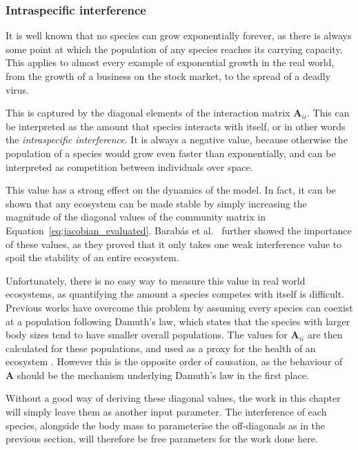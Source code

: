 \subsubsection{Intraspecific interference}
It is well known that no species can grow exponentially forever, as there is always some point at which the population of any species reaches its carrying capacity. 
This applies to almost every example of exponential growth in the real world, from the growth of a business on the stock market, to the spread of a deadly virus.

This is captured by the diagonal elements of the interaction matrix $\mathbf{A}_{ii}$. This can be interpreted as the amount that species interacts with itself, or in other words the \emph{intraspecific interference}. It is always a negative value, because otherwise the population of a species would grow even faster than exponentially, and can be interpreted as competition between individuals over space.

This value has a strong effect on the dynamics of the model. In fact, it can be shown that any ecosystem can be made stable by simply increasing the magnitude of the diagonal values of the community matrix in Equation~\eqref{eq:jacobian_evaluated}. 
Barab\'as et al.\ \cite{Barabas2017} further showed the importance of these values, as they proved that it only takes one weak interference value to spoil the stability of an entire ecosystem.

Unfortunately, there is no easy way to measure this value in real world ecosystems, as quantifying the amount a species competes with itself is difficult. Previous works have overcome this problem by assuming every species can coexist at a population following Damuth's law, which states that the species with larger body sizes tend to have smaller overall populations. The values for $\mathbf{A}_{ii}$ are then calculated for these populations, and used as a proxy for the health of an ecosystem \cite{Pawar}. However this is the opposite order of causation, as the behaviour of $\mathbf{A}$ should be the mechanism underlying Damuth's law in the first place.

Without a good way of deriving these diagonal values, the work in this chapter will simply leave them as another input parameter. The interference of each species, alongside the body mass to parameterise the off-diagonals as in the previous section, will therefore be free parameters for the work done here.

